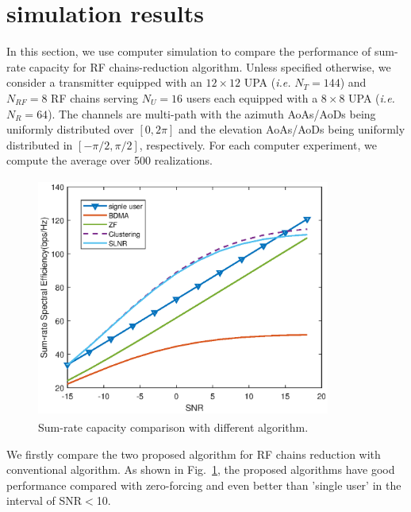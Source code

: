 \documentclass[conference]{IEEEtran}
\begin{document}
\section{simulation results}
In this section, we use computer simulation to compare the performance of sum-rate capacity for RF chains-reduction algorithm. Unless specified otherwise, we consider a transmitter equipped with an $12\times 12$ UPA ({\em i.e.} $N_T=144$) and $N_{RF}=8$ RF chains serving $N_U=16$ users each equipped with a $8\times 8$ UPA ({\em i.e.} $N_R=64$). The channels are multi-path with the azimuth AoAs/AoDs being uniformly distributed over $[0, 2\pi]$ and the elevation AoAs/AoDs being uniformly distributed in $[-\pi/2, \pi/2]$, respectively. For each computer experiment, we compute the average over 500 realizations.

\begin{figure}[ht]
	\begin{center}
		\includegraphics[width=3.8in,height=3.1in]{Figure/comparison.eps}
		\caption{Sum-rate capacity comparison with different algorithm.}\label{fig:MultiuserGain}
	\end{center}
\end{figure}


We firstly compare the two proposed algorithm for RF chains reduction with conventional algorithm. As shown in Fig.~\ref{fig:MultiuserGain}, the proposed algorithms have good performance compared with zero-forcing and even better than 'single user' in the interval of SNR$<$10.
\end{document}
